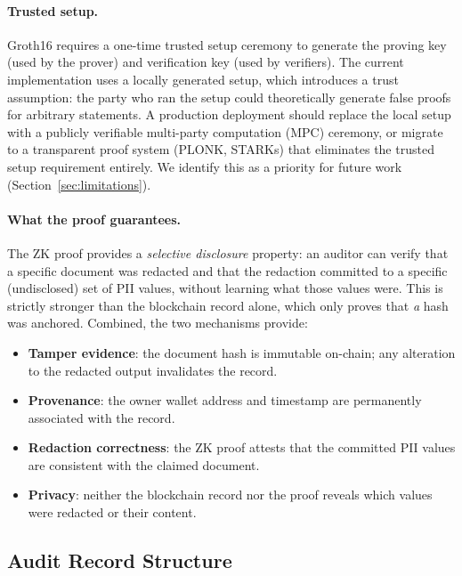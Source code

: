\documentclass[conference]{IEEEtran}
\begin{document}
\paragraph{Trusted setup.}
Groth16 requires a one-time trusted setup ceremony
to generate the proving key (used by the prover) and
verification key (used by verifiers).
The current implementation uses a locally generated
setup, which introduces a trust assumption: the party
who ran the setup could theoretically generate false
proofs for arbitrary statements.
A production deployment should replace the local
setup with a publicly verifiable multi-party
computation (MPC) ceremony, or migrate to a
transparent proof system (PLONK, STARKs) that
eliminates the trusted setup requirement entirely.
We identify this as a priority for future work
(Section~\ref{sec:limitations}).

\paragraph{What the proof guarantees.}
The ZK proof provides a \emph{selective disclosure}
property: an auditor can verify that a specific
document was redacted and that the redaction
committed to a specific (undisclosed) set of PII
values, without learning what those values were.
This is strictly stronger than the blockchain
record alone, which only proves that \emph{a}
hash was anchored.
Combined, the two mechanisms provide:

\begin{itemize}
  \item \textbf{Tamper evidence}: the document
        hash is immutable on-chain; any alteration
        to the redacted output invalidates the record.
  \item \textbf{Provenance}: the owner wallet
        address and timestamp are permanently
        associated with the record.
  \item \textbf{Redaction correctness}: the ZK
        proof attests that the committed PII values
        are consistent with the claimed document.
  \item \textbf{Privacy}: neither the blockchain
        record nor the proof reveals which values
        were redacted or their content.
\end{itemize}

\subsection{Audit Record Structure}
\end{document}

